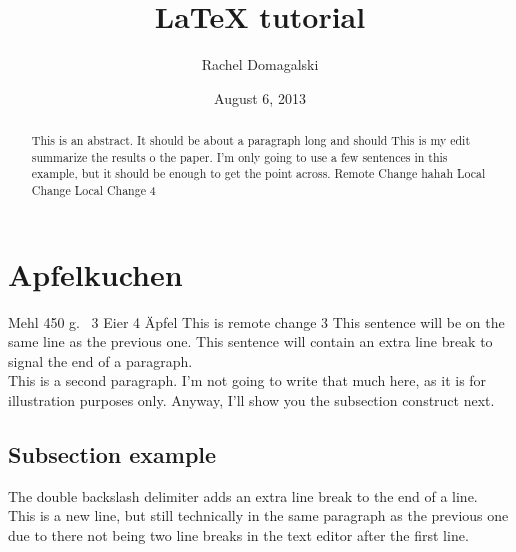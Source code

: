 \documentclass[11pt,letterpaper]{article}
\title{LaTeX tutorial}
\author{Rachel Domagalski}
\date{August 6, 2013}
\begin{document}
\maketitle %

\begin{abstract}
    This is an abstract. It should be about a paragraph long and should
    This is my edit
    summarize the results o  the paper. I'm only going to use a few sentences in
    this example, but it should be enough to get the point across.
    Remote Change hahah
    Local Change
    Local Change 4
    
    \end{abstract}

\section{Apfelkuchen}

Mehl 450 g.~\cite[S.~56]{CarlvonOssietzkyUniversitatOldenburg.2005}
3 Eier 
4 Äpfel
This is remote change 3
This sentence will be on the same line as the previous one.
This sentence will contain an extra line break to signal the end of a
paragraph.\\

This is a second paragraph. I'm not going to write that much here, as it is for
illustration purposes only. Anyway, I'll show you the subsection construct next.

\subsection{Subsection example}

The double backslash delimiter adds an extra line break to the end of a line.\\
This is a new line, but still technically in the same paragraph as the previous
one due to there not being two line breaks in the text editor after the first
line.
\end{document}
